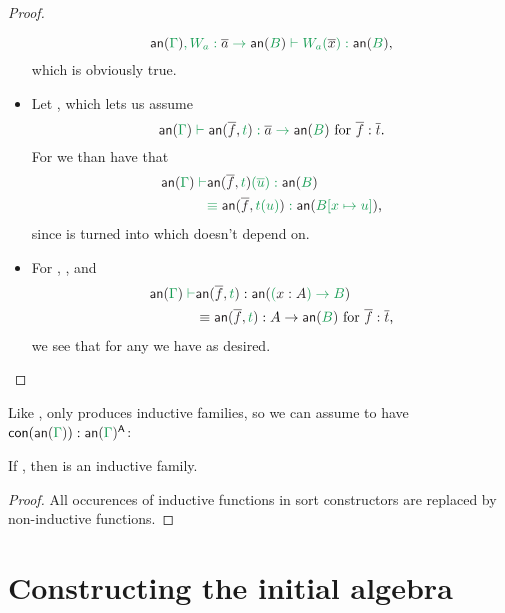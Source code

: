 \begin{proof}
\begin{itemize}
\begin{equation*}
\grm{\annotate{\Gamma}, W_a : \blm{\overline{a}} \to \annotate{B} \vdash W_a(\blm{\overline{x}}) : \annotate{B}} \text{,}
\end{equation*}
which is obviously true.
\item Let , which lets us assume
\begin{equation*}
\grm{\annotate{\Gamma} \vdash \anntwo{\overline{f}}{t} : \blm{\overline{a}} \to \annotate{B}} \text{ for \blm{\overline{f} : \overline{t}}.}
\end{equation*}
For  we than have that
\begin{align*}
\grm{\annotate{\Gamma} \vdash} & \grm{\anntwo{\overline{f}}{t}(\overline{u}) : \annotate{B}} \\
& \grm{\equiv \anntwo{\overline{f}}{t(u)} : \annotate{B[x \mapsto u]}} \text{,}
\end{align*}
since  is turned into  which  doesn't depend on. %
\item For , \grm{\vdash \annotate{\Gamma}}, and
\begin{align*}
\grm{\annotate{\Gamma} \vdash} & \anntwo{\overline{f}}{t} : \annotate{(\blm{x : A}) \to B} \\
& \equiv \anntwo{\overline{f}}{t} : A \to \annotate{B} \text{ for \blm{\overline{f} : \overline{t}},}
\end{align*}
we see that for any  we have 
as desired.
\end{itemize}
\end{proof}

Like \grm{\flatten{}}, \grm{\annotate{}} only produces inductive families, so
we can assume to have $\con{\grm{\annotate{\Gamma}}} : \grm{\annotate{\Gamma}}^\CC$:

\begin{lemma}
If \grm{\vdash{\Gamma}}, then \grm{\annotate{\Gamma}} is an inductive family.
\end{lemma}

\begin{proof}
All occurences of inductive functions in sort constructors are replaced
by non-inductive functions.
\end{proof}

\section{Constructing the initial algebra}

